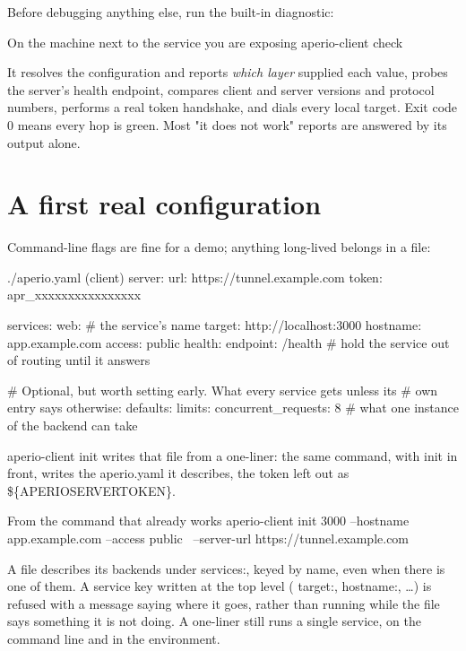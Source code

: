 \documentclass[11pt,a4paper,oneside]{book}
\newcommand{\aperiobreakableunderscore}{\textunderscore\allowbreak}
\newcommand{\aperiocodebreaks}{\XeTeXinterchartokenstate=1 }
\newcommand{\aperiocodebreaks}{}
\DeclareRobustCommand{\code}[1]{{\ttfamily\small\aperiocodebreaks
  \let\_\aperiobreakableunderscore#1}}
\begin{document}
Before debugging anything else, run the built-in diagnostic:

\begin{codecard}[aperiosh]{On the machine next to the service you are exposing}
aperio-client check
\end{codecard}

It resolves the configuration and reports \emph{which layer} supplied each
value, probes the server's health endpoint, compares client and server
versions and protocol numbers, performs a real token handshake, and dials
every local target. Exit code \code{0} means every hop is green. Most
"it does not work" reports are answered by its output alone.

\section{A first real configuration}

Command-line flags are fine for a demo; anything long-lived belongs in a
file:

\begin{codecard}[aperioyaml]{./aperio.yaml (client)}
server:
  url: https://tunnel.example.com
  token: apr_xxxxxxxxxxxxxxxx

services:
  web:                       # the service's name
    target: http://localhost:3000
    hostname: app.example.com
    access: public
    health:
      endpoint: /health      # hold the service out of routing until it answers

# Optional, but worth setting early. What every service gets unless its
# own entry says otherwise:
defaults:
  limits:
    concurrent_requests: 8   # what one instance of the backend can take
\end{codecard}

\code{aperio-client init} writes that file from a one-liner: the same
command, with \code{init} in front, writes the \code{aperio.yaml} it
describes, the token left out as \code{\$\{APERIO\_SERVER\_TOKEN\}}.

\begin{codecard}[aperiosh]{From the command that already works}
aperio-client init 3000 --hostname app.example.com --access public \
  --server-url https://tunnel.example.com
\end{codecard}

A file describes its backends under \code{services:}, keyed by name, even
when there is one of them. A service key written at the top level
(\code{target:}, \code{hostname:}, \ldots) is refused with a message saying
where it goes, rather than running while the file says something it is not
doing. A one-liner still runs a single service, on the command line and in
the environment.
\end{document}
